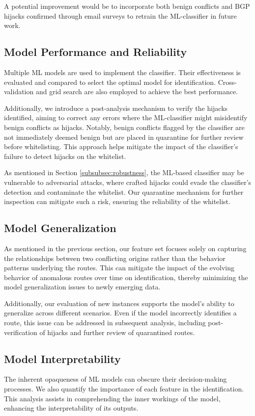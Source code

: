 A potential improvement would be to incorporate both benign conflicts and BGP hijacks confirmed through email surveys to retrain the ML-classifier in future work.

\subsection{Model Performance and Reliability}
Multiple ML models are used to implement the classifier. Their effectiveness is evaluated and compared to select the optimal model for identification. Cross-validation and grid search are also employed to achieve the best performance.

Additionally, we introduce a post-analysis mechanism to verify the hijacks identified, aiming to correct any errors where the ML-classifier might misidentify benign conflicts as hijacks. Notably, benign conflicts flagged by the classifier are not immediately deemed benign but are placed in quarantine for further review before whitelisting. This approach helps mitigate the impact of the classifier's failure to detect hijacks on the whitelist.

As mentioned in Section \ref{subsubsec:robustness}, the ML-based classifier may be vulnerable to adversarial attacks, where crafted hijacks could evade the classifier's detection and contaminate the whitelist.
Our quarantine mechanism for further inspection can mitigate such a risk, ensuring the reliability of the whitelist.

\subsection{Model Generalization}
As mentioned in the previous section, our feature set focuses solely on capturing the relationships between two conflicting origins rather than the behavior patterns underlying the routes.
This can mitigate the impact of the evolving behavior of anomalous routes over time on identification, thereby minimizing the model generalization issues to newly emerging data.

Additionally, our evaluation of new instances supports the model's ability to generalize across different scenarios. Even if the model incorrectly identifies a route, this issue can be addressed in subsequent analysis, including post-verification of hijacks and further review of quarantined routes.

\subsection{Model Interpretability}
The inherent opaqueness of ML models can obscure their decision-making processes. We also quantify the importance of each feature in the identification.
This analysis assists in comprehending the inner workings of the model, enhancing the interpretability of its outputs.


